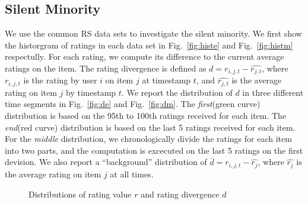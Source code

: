 \documentclass{sig-alternate}
\begin{document}
\subsection{Silent Minority}
 We use the common RS data sets to investigate the silent minority. We first show the historgram of ratings in each data set in Fig.~\ref{fig:histe} and Fig.~\ref{fig:histm} respectully. For each rating, we compute its difference to the current average ratings on the item. The rating divergence is defined as $d=r_{i,j,t}-\hat{r_{j,t}}$, where $r_{i,j,t}$ is the rating by user $i$ on item $j$ at timestamp $t$, and $\hat{r_{j,t}}$ is the average rating on item $j$ by timestamp $t$. We report the distribution of $d$ in three different time segments in Fig.~\ref{fig:de} and Fig.~\ref{fig:dm}. The \textit{first}(green curve) distribution is based on the 95th to 100th ratings received for each item. The \textit{end}(red curve) distribution is based on the last 5 ratings received for each item. For the \textit{middle} distribution, we chronologically divide the ratings for each item into two parts, and the computation is excecuted on the last 5 ratings on the first devision.  We also report a ``background'' distribution of $\bar{d}=r_{i,j,t}-\hat{r_{j}}$, where $\hat{r_{j}}$ is the average rating on item $j$ at all times.
\begin{figure}[htbp]
\centering
{}
\caption{Distributions of rating value $r$ and rating divergence $d$}\label{fig:minority}
\end{figure}
\end{document}
